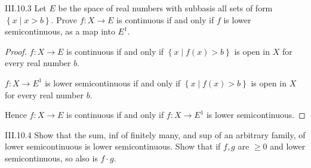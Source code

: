 \begin{problem}{III.10.3}
Let \(E\) be the space of real numbers with subbasis all sets of form \( \left\{ x \mid x > b \right\} \). Prove \( f: X \to E \) is continuous if and only if \(f\) is lower semicontinuous, as a map into \( E^{1} \).
\end{problem}

\begin{proof}
	\( f: X \to E \) is continuous if and only if \( \left\{ x \mid f(x) > b \right\} \) is open in \( X \) for every real number \( b \).

	\( f: X \to E^{1} \) is lower semicontinuous if and only if \( \left\{ x \mid f(x) > b \right\} \) is open in \( X \) for every real number \( b \).

	Hence  \( f: X \to E \) is continuous if and only if \( f: X \to E^{1} \) is lower semicontinuous.
\end{proof}

\begin{problem}{III.10.4}\label{problem:III.10.4}
Show that the sum, inf of finitely many, and sup of an arbitrary family, of lower semicontinuous is lower semicontinuous. Show that if \( f, g \) are \( \ge 0 \) and lower semicontinuous, so also is \( f \cdot g \).
\end{problem}

